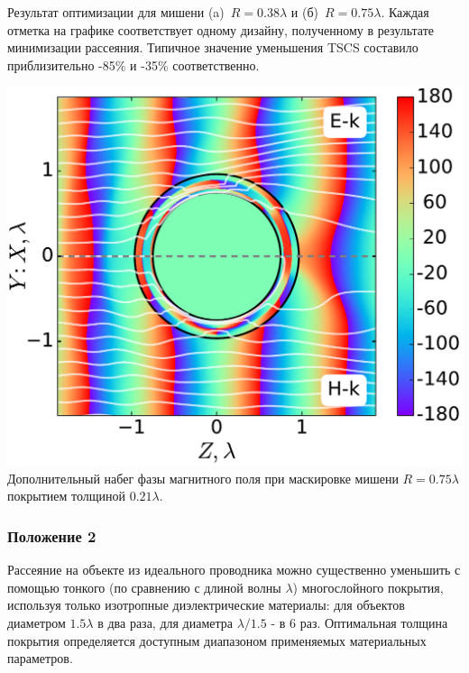 \documentclass[14pt]{beamer}
\begin{document}
\begin{frame}
\begin{center}
\begin{minipage}[ht]{0.49\linewidth}
  \end{minipage}
  Результат оптимизации для мишени (a)~${R = 0.38\lambda}$ и
    (б)~${R = 0.75\lambda}$. Каждая отметка на графике
    соответствует одному дизайну, полученному в результате
    минимизации рассеяния. Типичное значение уменьшения TSCS
    составило приблизительно -85\% и -35\%
    соответственно.%
\end{center}
\end{frame}

\begin{frame}
  \begin{center}
    \includegraphics[width=0.8\linewidth]{PEC-index-dv-R4-XYZ-angleHy-rainbow}    \\
    \vspace{1em} \small Дополнительный набег фазы магнитного поля при
    маскировке мишени ${R = 0.75\lambda}$ покрытием толщиной
    $0.21\lambda$.
\end{center}
\end{frame}

\begin{frame}
  \frametitle{Положение 2}
  \begin{center} Рассеяние на объекте из идеального проводника можно
    существенно уменьшить с помощью тонкого (по сравнению с длиной
    волны $\lambda$) многослойного покрытия, используя только
    изотропные диэлектрические материалы: для объектов диаметром
    $1.5\lambda$ в два раза, для диаметра $\lambda/1.5$ - в 6
    раз. Оптимальная толщина покрытия определяется доступным
    диапазоном применяемых материальных параметров.
  \end{center}
\end{frame}
\end{document}
